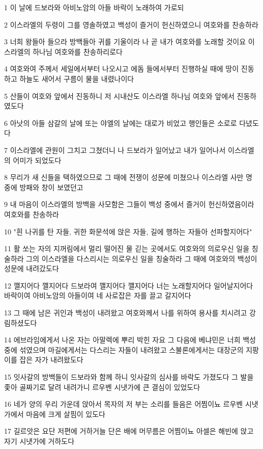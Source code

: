\par 1 이 날에 드보라와 아비노암의 아들 바락이 노래하여 가로되
\par 2 이스라엘의 두령이 그를 영솔하였고 백성이 즐거이 헌신하였으니 여호와를 찬송하라
\par 3 너희 왕들아 들으라 방백들아 귀를 기울이라 나 곧 내가 여호와를 노래할 것이요 이스라엘의 하나님 여호와를 찬송하리로다
\par 4 여호와여 주께서 세일에서부터 나오시고 에돔 들에서부터 진행하실 때에 땅이 진동하고 하늘도 새어서 구름이 물을 내렸나이다
\par 5 산들이 여호와 앞에서 진동하니 저 시내산도 이스라엘 하나님 여호와 앞에서 진동하였도다
\par 6 아낫의 아들 삼갈의 날에 또는 야엘의 날에는 대로가 비었고 행인들은 소로로 다녔도다
\par 7 이스라엘에 관원이 그치고 그쳤더니 나 드보라가 일어났고 내가 일어나서 이스라엘의 어미가 되었도다
\par 8 무리가 새 신들을 택하였으므로 그 때에 전쟁이 성문에 미쳤으나 이스라엘 사만 명 중에 방패와 창이 보였던고
\par 9 내 마음이 이스라엘의 방백을 사모함은 그들이 백성 중에서 즐거이 헌신하였음이라 여호와를 찬송하라
\par 10 "흰 나귀를 탄 자들, 귀한 화문석에 앉은 자들, 길에 행하는 자들아 선파할지어다"
\par 11 활 쏘는 자의 지꺼림에서 멀리 떨어진 물 긷는 곳에서도 여호와의 의로우신 일을 칭술하라 그의 이스라엘을 다스리시는 의로우신 일을 칭술하라 그 때에 여호와의 백성이 성문에 내려갔도다
\par 12 깰지어다 깰지어다 드보라여 깰지어다 깰지어다 너는 노래할지어다 일어날지어다 바락이여 아비노암의 아들이여 네 사로잡은 자를 끌고 갈지어다
\par 13 그 때에 남은 귀인과 백성이 내려왔고 여호와께서 나를 위하여 용사를 치시려고 강림하셨도다
\par 14 에브라임에게서 나온 자는 아말렉에 뿌리 박힌 자요 그 다음에 베냐민은 너희 백성 중에 섞였으며 마길에게서는 다스리는 자들이 내려왔고 스불론에게서는 대장군의 지팡이를 잡은 자가 내려왔도다
\par 15 잇사갈의 방백들이 드보라와 함께 하니 잇사갈의 심사를 바락도 가졌도다 그 발을 좇아 골짜기로 달려 내려가니 르우벤 시냇가에 큰 결심이 있었도다
\par 16 네가 양의 우리 가운데 앉아서 목자의 저 부는 소리를 들음은 어찜이뇨 르우벤 시냇가에서 마음에 크게 살핌이 있도다
\par 17 길르앗은 요단 저편에 거하거늘 단은 배에 머무름은 어찜이뇨 아셀은 해빈에 앉고 자기 시냇가에 거하도다
